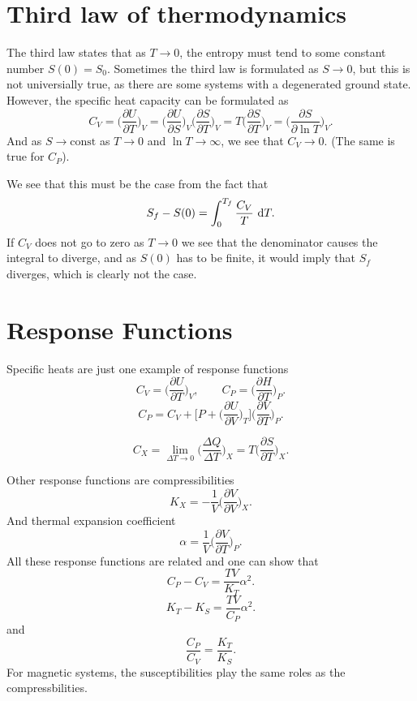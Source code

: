 \documentclass[a4paper, 11pt, notitlepage, english]{article}
\renewcommand{\d}{{\rm d}}
\newcommand{\p}{\partial}
\begin{document}
\clearpage

\section*{Third law of thermodynamics}
 
The third law states that as $T \to 0$, the entropy must tend to some constant number $S(0) = S_0$. Sometimes the third law is formulated as $S\to0$, but this is not universially true, as there are some systems with a degenerated ground state. However, the specific heat capacity can be formulated as
$$C_V = \bigg(\frac{\p U}{\p T}\bigg)_V = \bigg(\frac{\p U}{\p S}\bigg)_V\bigg(\frac{\p S}{\p T}\bigg)_V = T\bigg(\frac{\p S}{\p T}\bigg)_V = \bigg(\frac{\p S}{\p \ln T} \bigg)_V.$$
And as $S \to \mbox{const}$ as $T \to 0$ and $\ln T \to \infty$, we see that $C_V \to 0$. (The same is true for $C_P$).

We see that this must be the case from the fact that
$$S_f - S(0) = \int_0^{T_{f}} \frac{C_V}{T} \ \d T.$$
If $C_V$ does not go to zero as $T \to 0$ we see that the denominator causes the integral to diverge, and as $S(0)$ has to be finite, it would imply that $S_f$ diverges, which is clearly not the case.

\clearpage

\section*{Response Functions}

Specific heats are just one example of response functions
$$C_V = \bigg(\frac{\p U}{\p T}\bigg)_V, \qquad C_P = \bigg(\frac{\p H}{\p T}\bigg)_P.$$
$$C_P = C_V + \bigg[P + \bigg(\frac{\p U}{\p V}\bigg)_T\bigg]\bigg(\frac{\p V}{\p T}\bigg)_P.$$

$$C_X = \lim_{\Delta T \to 0} \bigg(\frac{\Delta Q}{\Delta T}\bigg)_X = T\bigg(\frac{\p S}{\p T}\bigg)_X.$$

Other response functions are compressibilities
$$K_X = -\frac{1}{V}\bigg(\frac{\p V}{\p V}\bigg)_X.$$
And thermal expansion coefficient
$$\alpha = \frac{1}{V}\bigg(\frac{\p V}{\p T}\bigg)_P.$$
All these response functions are related and one can show that
$$C_P - C_V = \frac{TV}{K_T}\alpha^2.$$
$$K_T - K_S = \frac{TV}{C_P}\alpha^2.$$
and
$$\frac{C_P}{C_V} = \frac{K_T}{K_S}.$$
For magnetic systems, the susceptibilities play the same roles as the compressbilities.
\end{document}
